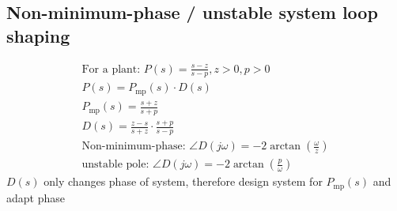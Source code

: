 \subsection*{Non-minimum-phase / unstable system loop shaping}
\begin{align*}
    \text{For a plant: } P(s) = \frac{s - z}{s - p}, z > 0, p > 0\\
    P(s) = P_{\text{mp}}(s) \cdot D(s)\\
    P_{\text{mp}}(s) = \frac{s + z}{s + p}\\
    D(s) = \frac{z - s}{s + z} \cdot \frac{s + p}{s - p}\\
    \text{Non-minimum-phase: } \angle D(j \omega) = -2 \arctan(\frac{\omega}{z})\\
    \text{unstable pole: } \angle D(j \omega) = -2 \arctan(\frac{p}{\omega})
\end{align*}
$D(s)$ only changes phase of system, therefore design system for $P_{\text{mp}}(s)$ and adapt phase